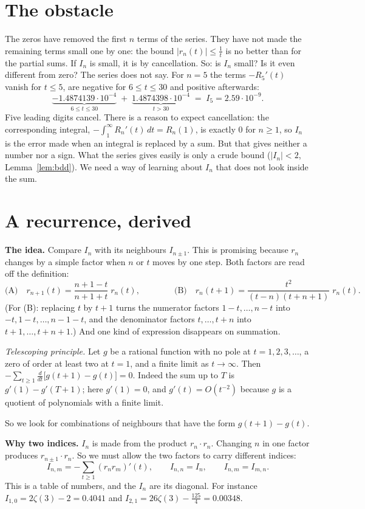 \documentclass[11pt]{article}
\newcommand{\q}[1]{\medskip\noindent\textbf{#1}}
\begin{document}
\section{The obstacle}

The zeros have removed the first $n$ terms of the series. They have not made the remaining terms
small one by one: the bound $|r_n(t)|\le\frac1t$ is no better than for the partial sums. If $I_n$
is small, it is by cancellation. So: is $I_n$ small? Is it even different from zero? The series
does not say. For $n=5$ the terms
$-R_5'(t)$ vanish for $t\le5$, are negative for $6\le t\le30$ and positive afterwards:
\[
\underbrace{-1.4874139\cdot10^{-4}}_{6\le t\le30}\;+\;\underbrace{1.4874398\cdot10^{-4}}_{t>30}
\;=\;I_5=2.59\cdot10^{-9}.
\]
Five leading digits cancel. There is a reason to expect cancellation: the corresponding integral,
$-\int_1^\infty R_n'(t)\,dt=R_n(1)$, is exactly $0$ for $n\ge1$, so $I_n$ is the error made when an
integral is replaced by a sum. But that gives neither a number nor a sign. What the series gives
easily is only a crude bound ($|I_n|<2$, Lemma~\ref{lem:bdd}). We need a way of learning about
$I_n$ that does not look inside the sum.

\section{A recurrence, derived}

\q{The idea.} Compare $I_n$ with its neighbours $I_{n\pm1}$. This is promising because $r_n$ changes
by a simple factor when $n$ or $t$ moves by one step. Both factors are read off the definition:
\[
\text{(A)}\quad r_{n+1}(t)=\frac{n+1-t}{n+1+t}\;r_n(t),\qquad\qquad
\text{(B)}\quad r_n(t+1)=\frac{t^2}{(t-n)(t+n+1)}\;r_n(t).
\]
(For (B): replacing $t$ by $t+1$ turns the numerator factors $1-t,\dots,n-t$ into
$-t,1-t,\dots,n-1-t$, and the denominator factors $t,\dots,t+n$ into $t+1,\dots,t+n+1$.)
And one kind of expression disappears on summation.

\emph{Telescoping principle.} Let $g$ be a rational function with no pole at $t=1,2,3,\dots$, a
zero of order at least two at $t=1$, and a finite limit as $t\to\infty$. Then
$-\sum_{t\ge1}\frac d{dt}\bigl[g(t+1)-g(t)\bigr]=0$. Indeed the sum up to $T$ is $g'(1)-g'(T+1)$;
here $g'(1)=0$, and $g'(t)=O(t^{-2})$ because $g$ is a quotient of polynomials with a finite
limit.

So we look for combinations of neighbours that have the form $g(t+1)-g(t)$.

\q{Why two indices.} $I_n$ is made from the product $r_n\cdot r_n$. Changing $n$ in one factor
produces $r_{n\pm1}\cdot r_n$. So we must allow the two factors to carry different indices:
\[
I_{n,m}=-\sum_{t\ge1}(r_nr_m)'(t),\qquad I_{n,n}=I_n,\qquad I_{n,m}=I_{m,n}.
\]
This is a table of numbers, and the $I_n$ are its diagonal. For instance
$I_{1,0}=2\zeta(3)-2=0.4041$ and $I_{2,1}=26\zeta(3)-\frac{125}4=0.00348$.
\end{document}
